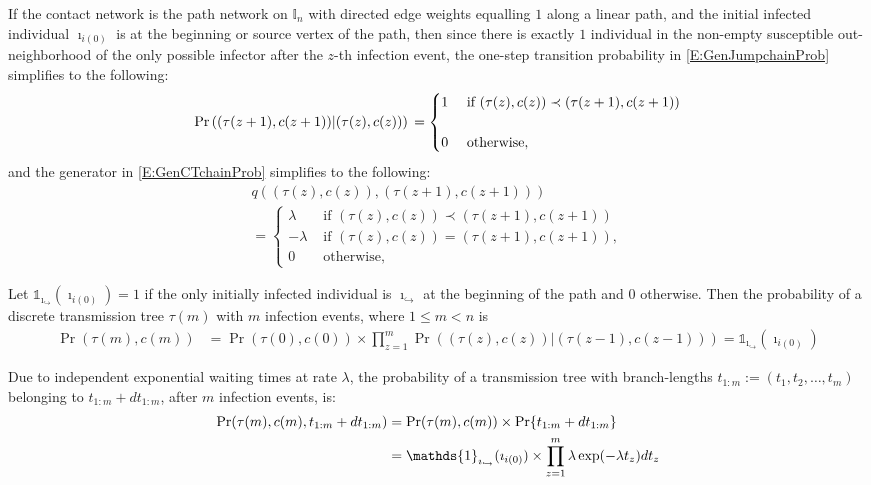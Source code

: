 \documentclass[review]{elsarticle}
\numberwithin{equation}{section}
\let\orgautoref\autoref
\renewcommand{\autoref}
        {\def\equationautorefname{Eq.}%
         \def\figureautorefname{Fig.}%
         \def\subfigureautorefname{Fig.}%
         \def\sectionautorefname{Sect.}%
         \def\subsectionautorefname{Sect.}%
         \def\subsubsectionautorefname{Sect.}%
         \def\Itemautorefname{item}%
         \def\tableautorefname{Table}%
         \def\propositionautorefname{Prop.}%
         \def\corollaryautorefname{Corollary}%
         \def\theoremautorefname{Theorem}%
         \def\remarkautorefname{Remark}%
         \def\lemmaautorefname{Lemma}%
         \def\proofofautorefname{Proof}%
         \def\exampleautorefname{Example}%
         \orgautoref}
\newcommand{\bI}{{\mathbb I}}
\begin{document}
If the contact network is the path network on $\bI_n$ with directed edge weights equalling $1$ along a linear path, 
and the initial infected individual $\imath_{i(0)}$ is at the beginning or source vertex of the path, 
then since there is exactly $1$ individual in the non-empty susceptible out-neighborhood of the only possible infector after the $z$-th infection event, 
the one-step transition probability in \autoref{E:GenJumpchainProb} simplifies to the following:
\begin{equation}\label{E:GenJumpchainProbpn}
\Pr\left( (\tau(z+1),c(z+1)) | (\tau(z),c(z)) \right)\\
=
\begin{cases}
1
& \text{ if } (\tau(z),c(z)) \prec (\tau(z+1),c(z+1))\\\\
0 & \text{ otherwise},
\end{cases}
\end{equation}
and the generator in \autoref{E:GenCTchainProb} simplifies to the following:
\begin{multline}\label{E:GenCTchainProbpn}
q\left( (\tau(z),c(z)), (\tau(z+1),c(z+1)) \right)\\
=
\begin{cases}
\lambda 
& \text{ if } (\tau(z),c(z))  \prec (\tau(z+1),c(z+1))\\
-\lambda 
& \text{ if } (\tau(z),c(z)) = (\tau(z+1),c(z+1)),\\
0 & \text{ otherwise},
\end{cases}
\end{multline}

Let $\mathds{1}_{\imath_{\hookrightarrow}}(\imath_{i(0)})=1$ if the only initially infected individual is $\imath_{\hookrightarrow}$ at the beginning of the path and $0$ otherwise.  
Then the probability of a discrete transmission tree $\tau(m)$ with $m$ infection events, where $1\leq m < n$ is
\begin{align}\label{E:GenCTchainProbrpnTree}
\Pr(\tau(m),c(m)) 
&= \Pr(\tau(0),c(0)) \times \prod_{z=1}^m \Pr((\tau(z),c(z)) | (\tau(z-1),c(z-1)) ) = \mathds{1}_{\imath_{\hookrightarrow}}(\imath_{i(0)}) 
\end{align}

Due to independent exponential waiting times at rate $\lambda$, the probability of a transmission tree with branch-lengths 
$t_{1:m} := (t_1,t_2,\ldots,t_m)$ belonging to $t_{1:m}+dt_{1:m}$, after $m$ infection events, is:
\begin{align}
\Pr(\tau(m),c(m),t_{1:m}+dt_{1:m}) 
&= \Pr(\tau(m),c(m)) \times \Pr\{ t_{1:m}+dt_{1:m} \} \notag \\
&=  \mathds{1}_{\imath_{\hookrightarrow}}(\imath_{i(0)}) \times \prod_{z=1}^m \lambda \exp(-\lambda t_z) dt_z \notag
\end{align}
\end{document}
